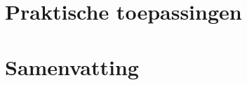 \documentclass[12pt,reqno]{article}
\newcommand*{\ZZ}{\ensuremath{\mathbb{Z}}}
\theoremstyle{theorem}
\newtheorem{theorem}{Stelling}
\newtheorem{proposition}[theorem]{Propositie}
\theoremstyle{definition}
\begin{document}
	
%	
%	
	
	\section{Praktische toepassingen}
	
	\section{Samenvatting}
	
	
	
	
\end{document}
